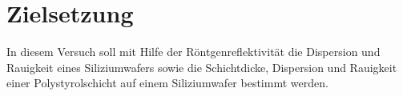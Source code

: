 \section{Zielsetzung}
In diesem Versuch soll mit Hilfe der Röntgenreflektivität die Dispersion und Rauigkeit eines Siliziumwafers
sowie die Schichtdicke, Dispersion und Rauigkeit einer Polystyrolschicht auf einem Siliziumwafer bestimmt werden.
